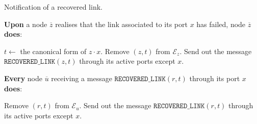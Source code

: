 \begin{algorithm}[htbp]
\caption{Notification of a recovered link.}
\label{al:lrecovery_notif}

\textbf{Upon} a node $\overline{z}$ realises that the link associated to its port $x$ has failed, node $\overline{z}$ \textbf{does}:
     
\begin{algorithmic}[1]
	\STATE $t\leftarrow$ the canonical form of $z\cdot x$.
    \STATE Remove $(z,t)$ from $\mathcal{E}_{z}$.
    \STATE Send out the message $\texttt{RECOVERED\_LINK}(z,t)$ through its active ports except $x$.
\end{algorithmic}

\textbf{Every} node  $\overline{u}$ receiving a message $\texttt{RECOVERED\_LINK}(r,t)$ through its port $x$ \textbf{does}:

\begin{algorithmic}[1]
    \STATE Remove $(r,t)$ from $\mathcal{E}_{u}.$
    \STATE Send out the message $\texttt{RECOVERED\_LINK}(r,t)$ through its active ports except $x$.
    \ENDIF
\end{algorithmic}
\end{algorithm}